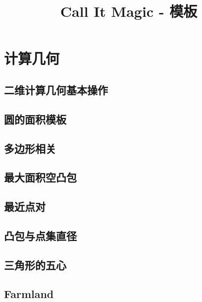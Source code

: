 \documentclass[10pt]{article}
\begin{document}
\title{Call It Magic - 模板}
\date{}
\tableofcontents
\newpage

\section{计算几何}

	\subsection{二维计算几何基本操作}
		
		
	\subsection{圆的面积模板}
		

	\subsection{多边形相关}
		

	\subsection{最大面积空凸包}
		

	\subsection{最近点对}
		

	\subsection{凸包与点集直径}
		

	\subsection{三角形的五心}
		

	\subsection{Farmland}
		
\end{document}
